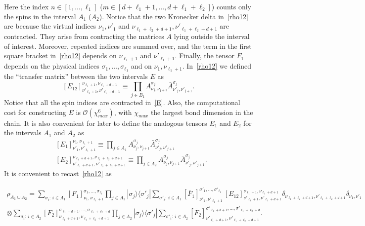 \documentclass[twocolumn,superscriptaddress,prb,10pt]{revtex4-1}
\begin{document}
Here the index $n\in[1,\dots,\ell_1]$ ($m\in[d+\ell_1+1,\dots,d+\ell_1+\ell_2]$) counts 
only the spins in the interval $A_1$ ($A_2$). Notice that the two Kronecker delta 
in~\eqref{rho12} are because the virtual indices $\nu_1,\nu'_1$ and 
$\nu_{\ell_1+\ell_2+d+1},\nu'_{\ell_1+\ell_2+d+1}$ are contracted. They arise from 
contracting the matrices $A$ lying outside the interval of interest. Moreover, repeated 
indices are summed over, and the term in the first square bracket in~\eqref{rho12} 
depends on $\nu_{\ell_1+1}$ and $\nu'_{\ell_1+1}$. Finally, the tensor $F_1$ depends on 
the physical indices $\sigma_1,\dots,\sigma_{\ell_1}$ and on $\nu_1,\nu_{\ell_1+1}$.
In~\eqref{rho12} we defined the ``transfer matrix'' between the two intervals $E$ as 
%
\begin{equation}
\label{E}
[E_{12}]^{\nu_{\ell_1+1},\nu_{\ell_1+d+1}}_{\nu'_{\ell_1+1},\nu'_{\ell_1+d+1}}\equiv 
\prod\limits_{j\in B_1}A^{\sigma_j}_{\nu_j,\nu_{j+1}}
\bar A^{\sigma_j}_{\nu'_j,\nu'_{j+1}}. 
\end{equation}
%
Notice that all the spin indices are contracted in~\eqref{E}. Also, the computational 
cost for constructing $E$ is ${\mathcal O}(\chi^6_{max})$, with $\chi_{max}$ the 
largest bond dimension in the chain. 
It is also convenient for later to define the analogous tensors $E_1$ and $E_2$ for 
the intervals $A_1$ and $A_2$ as 
%
\begin{align}
& [E_1]^{\nu_1,\nu_{\ell_1+1}}_{\nu'_1,\nu'_{\ell_1+1}}\equiv
\prod\limits_{j\in A_1}A^{\sigma_j}_{\nu_j,\nu_{j+1}}
\bar A^{\sigma_j}_{\nu'_j,\nu'_{j+1}}\\
& [E_2]^{\nu_{\ell_1+d+1},\nu_{\ell_1+\ell_2+d+1}}_{\nu'_{\ell_1+d+1},
\nu'_{\ell_1+\ell_2+d+1}}\equiv
\prod\limits_{j\in A_2}A^{\sigma_j}_{\nu_j,\nu_{j+1}}
\bar A^{\sigma_j}_{\nu'_j,\nu'_{j+1}}.
\end{align}
%
It is convenient to recast~\eqref{rho12} as 
%
\begin{widetext}
\begin{multline}
\rho_{A_1\cup A_2}=\sum_{\sigma_i:\, i\in A_1}
[F_1]^{\sigma_1,\dots,\sigma_{\ell_1}}_{\nu_1,\nu_{\ell_1+1}}\prod_{j\in A_1}|\sigma_j\rangle
\langle\sigma'_j|\sum_{\sigma'_i:\, i\in A_1}
[\bar F_1]^{\sigma'_1,\dots,\sigma'_{\ell_1}}_{\nu'_1,\nu'_{\ell_1+1}}\,
[E_{12}]^{\nu_{\ell_1+1},\nu_{\ell_1+d+1}}_{\nu'_{\ell_1+1},\nu'_{\ell_1+d+1}}
\delta_{\nu_{\ell_1+\ell_2+d+1},
\nu'_{\ell_1+\ell_2+d+1}}\delta_{\nu_1,\nu'_1}
\\\otimes\sum_{\sigma_i:\, i\in A_2}
[F_2]^{\sigma_{\ell_1+d+1},\dots,\sigma_{\ell_1+\ell_2+d}}_{\nu_{\ell_1+d+1},
\nu_{\ell_1+\ell_2+d+1}}\prod_{j\in A_2}|\sigma_j\rangle\langle\sigma'_j|
\sum_{\sigma'_i:\, i\in A_2}
[\bar F_2]^{\sigma'_{\ell_1+d+1},\dots,\sigma'_{\ell_1+\ell_2+d}}_{\nu'_{\ell_1+d+1},
\nu'_{\ell_1+\ell_2+d+1}}. 
\end{multline}
\end{widetext}
\end{document}
